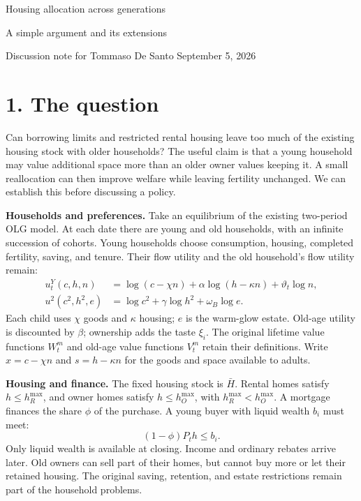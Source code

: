 \documentclass[11pt]{article}
\newcommand{\pageheading}[1]{\section*{#1}}
\begin{document}
\begin{center}
{\LARGE Housing allocation across generations}\par
\vspace{4pt}
A simple argument and its extensions\par
\smallskip
Discussion note for Tommaso De Santo \quad September 5, 2026
\end{center}

\pageheading{1. The question}

Can borrowing limits and restricted rental housing leave too much of the
existing housing stock with older households? The useful claim is that a
young household may value additional space more than an older owner values
keeping it. A small reallocation can then improve welfare while leaving
fertility unchanged. We can establish this before discussing a policy.

\textbf{Households and preferences.} Take an equilibrium of the existing
two-period OLG model. At each date there are young and old households, with
an infinite succession of cohorts. Young households choose consumption,
housing, completed fertility, saving, and tenure. Their flow utility and the
old household's flow utility remain:
\begin{align}
u_t^Y(c,h,n)&=\log(c-\chi n)+\alpha\log(h-\kappa n)+\vartheta_t\log n,\\
u^2(c^2,h^2,e)&=\log c^2+\gamma\log h^2+\omega_B\log e.
\end{align}
Each child uses $\chi$ goods and $\kappa$ housing; $e$ is the warm-glow estate.
Old-age utility is discounted by $\beta$; ownership adds the taste $\xi_i$.
The original lifetime value functions $W_t^m$ and old-age value functions
$V_t^m$ retain their definitions. Write $x=c-\chi n$ and $s=h-\kappa n$
for the goods and space available to adults.

\textbf{Housing and finance.} The fixed housing stock is $\bar H$. Rental
homes satisfy $h\leq h_R^{\max}$, and owner homes satisfy
$h\leq h_O^{\max}$, with $h_R^{\max}<h_O^{\max}$. A mortgage finances the
share $\phi$ of the purchase. A young buyer with liquid wealth $b_i$ must meet:
\begin{equation}
 (1-\phi)P_t h\leq b_i.
 \label{eq:simple_purchase}
\end{equation}
Only liquid wealth is available at closing. Income and ordinary rebates arrive
later. Old owners can sell part of their homes, but cannot buy more or let
their retained housing. The original saving, retention, and estate restrictions
remain part of the household problems.
\end{document}
